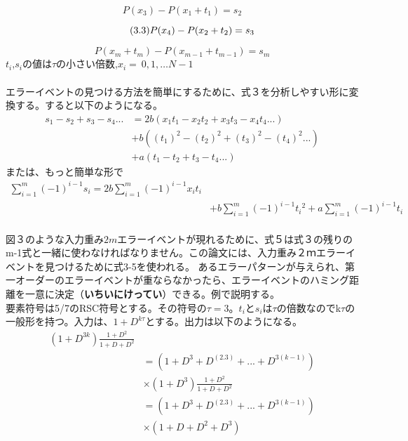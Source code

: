 \documentclass[24 pts]{article}
\begin{document}
\begin{equation}\tag{3.2}
P(x_3)-P(x_1+t_1)=s_2
\end{equation}

\begin{equation}\tag{3.3}
P(x_4)-P(x_2+t_2)=s_3\\
\end{equation}

\begin{equation}\tag{3.m}
P(x_m+t_m)-P(x_{m-1}+t_{m-1})=s_m
\end{equation}
$t_i$,$s_i$の値は$\tau$の小さい倍数,$x_i=\ {0,1,…N-1\ }$
\paragraph{}
エラーイベントの見つける方法を簡単にするために、式３を分析しやすい形に変換する。すると以下のようになる。
\begin{equation}\tag{4}
\begin{split}
s_1-s_2+s_3-s_4...&=2b(x_1t_1-x_2t_2+x_3t_3-x_4t_4...)\\
&+b((t_1)^2-(t_2)^2+(t_3)^2-(t_4)^2...)\\
&+a(t_1-t_2+t_3-t_4...)
\end{split}
\end{equation}
または、もっと簡単な形で
\begin{equation}\tag{5}
\begin{split}
\sum_{i=1}^m (-1)^{i-1}s_i=2b\sum_{i=1}^m (-1)^{i-1}x_it_i\\
&+b\sum_{i=1}^m (-1)^{i-1} {t_i}^2+a\sum_{i=1}^m (-1)^{i-1}t_i
\end{split}
\end{equation}
\paragraph{}
図３のような入力重み$2m$エラーイベントが現れるために、式５は式３の残りのm-1式と一緒に使わなければなりません。この論文には、入力重み２ｍエラーイベントを見つけるために式3-5を使われる。
あるエラーパターンが与えられ、第一オーダーのエラーイベントが重ならなかったら、エラーイベントのハミング距離を一意に決定（\textbf{いちいにけってい}）できる。例で説明する。\\
要素符号は5/7のRSC符号とする。その符号の$\tau=3$。$t_i$と$s_i$は$\tau$の倍数なのでk$\tau$の一般形を持つ。入力は、$1+D^{k\tau}$とする。出力は以下のようになる。
\begin{equation}\tag{6}
\begin{split}
(1+D^{3k})\frac{1+D^2}{1+D+D^2}\\
&=(1+D^3+D^(2.3)+...+D^{3(k-1)})\\
&\times(1+D^{3})\frac{1+D^2}{1+D+D^2}\\
&=(1+D^3+D^(2.3)+...+D^{3(k-1)})\\
&\times(1+D+D^2+D^3)
\end{split}
\end{equation}
\end{document}
